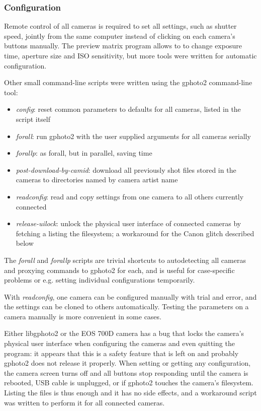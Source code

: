 
\subsubsection{Configuration} %

Remote control of all cameras is required to set all settings, such as shutter speed, jointly from the same computer instead of clicking on each camera's buttons manually.
The preview matrix program allows to to change exposure time, aperture size and ISO sensitivity, but more tools were written for automatic configuration.

Other small command-line scripts were written using the gphoto2 command-line tool:

\begin{itemize}
	\item \emph{config}: reset common parameters to defaults for all cameras, listed in the script itself
	\item \emph{forall}: run gphoto2 with the user supplied arguments for all cameras serially
	\item \emph{forallp}: as forall, but in parallel, saving time
	\item \emph{post-download-by-camid}: download all previously shot files stored in the cameras to directories named by camera artist name
	\item \emph{readconfig}: read and copy settings from one camera to all others currently connected
	\item \emph{release-uilock}: unlock the physical user interface of connected cameras by fetching a listing the filesystem; a workaround for the Canon glitch described below
\end{itemize}

The \emph{forall} and \emph{forallp} scripts are trivial shortcuts to autodetecting all cameras and proxying commands to gphoto2 for each, and is useful for case-specific problems or e.g. setting individual configurations temporarily.

With \emph{readconfig}, one camera can be configured manually with trial and error, and the settings can be cloned to others automatically.
Testing the parameters on a camera manually is more convenient in some cases.

Either libgphoto2 or the EOS 700D camera has a bug that locks the camera's physical user interface when configuring the cameras and even quitting the program:
it appears that this is a safety feature that is left on and probably gphoto2 does not release it properly.
When setting or getting any configuration, the camera screen turns off and all buttons stop responding until the camera is rebooted, USB cable is unplugged, or if gphoto2 touches the camera's filesystem.
Listing the files is thus enough and it has no side effects, and a workaround script was written to perform it for all connected cameras.

